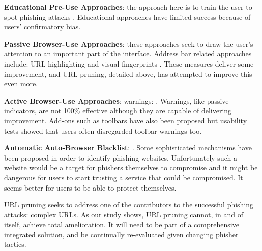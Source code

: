 {\bf Educational Pre-Use Approaches}:
the approach here is to train the user to spot phishing attacks \cite{kumaraguru2007protecting, alnajim2009antiphishing, TUD-CS-2013-0167, embedded2011jansson, sheng2007antiphishingphil}. Educational approaches have limited success \cite{kirlappos2012security} because of users' confirmatory bias. 

{\bf Passive Browser-Use Approaches}: these approaches seek to draw the user's attention to an important part of the interface. Address bar related approaches include:  URL highlighting \cite{lin2007,iphone} and visual fingerprints \cite{dhamija2005battle, visualisation}. These measures deliver some improvement, and URL pruning, detailed above, has attempted to improve this even more. 

{\bf Active Browser-Use Approaches}: warnings: \cite{akhawe2013alice, warnings}. 
Warnings, like passive indicators, are not 100\% effective although they are capable of delivering improvement. 
Add-ons such as toolbars have also been proposed \cite{li2007usability, tools, toolbars} but usability tests showed that users often disregarded toolbar warnings too. 

{\bf Automatic Auto-Browser Blacklist}:  \cite{Bar-Yossef:2009:CDD:1462148.1462151,balzarotti2012proactive, prakash2010phishnet}. Some sophisticated mechanisms have been proposed in order to identify phishing websites. Unfortunately such a website would be a target for phishers themselves to compromise and it might be dangerous for users to start trusting a service that could be compromised. It seems better for users to be able to protect themselves. 


URL pruning seeks to address one of the contributors to the successful phishing attacks: complex URLs.
As our study shows, URL pruning cannot, in and of itself, achieve total amelioration.
It will need to be part of a comprehensive integrated solution, and  be continually re-evaluated given changing phisher tactics.


